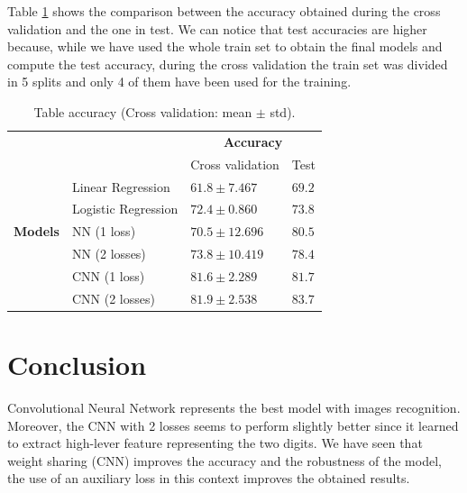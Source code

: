 \documentclass[journal, a4paper]{IEEEtran}
\begin{document}
Table \ref{table:accuracy} shows the comparison between the accuracy obtained during the cross validation and the one in test. We can notice that test accuracies are higher because, while we have used the whole train set to obtain the final models and compute the test accuracy, during the cross validation the train set was divided in 5 splits and only 4 of them have been used for the training.
\begin{table}
\centering
\caption{Table accuracy (Cross validation: mean $\pm$ std).}
\label{table:accuracy}
\begin{tabular}{|l|l|l|l|} 
\cline{3-4}
\multicolumn{1}{l}{} &                     & \multicolumn{2}{c|}{\textbf{Accuracy}}  \\ 
\cline{3-4}
\multicolumn{1}{l}{} &                     & Cross validation & Test                 \\ 
\hline
                     & Linear Regression   & $61.8\pm7.467$    & $69.2$                 \\ 
\cline{2-4}
     & Logistic Regression & $72.4 \pm0.860$    & $73.8$                 \\ 
\cline{2-4}
\textbf{Models}    & NN (1 loss)~        & $70.5 \pm12.696$   & $80.5$                 \\ 
\cline{2-4}
                     & NN (2 losses)~      & $73.8 \pm10.419$   & $78.4$                 \\ 
\cline{2-4}
                     & CNN (1 loss)~       & $81.6 \pm2.289$    & $81.7$                 \\ 
\cline{2-4}
                     & CNN (2 losses)      & $81.9 \pm2.538$    & $83.7$                 \\
\hline
\end{tabular}
\end{table}

\section{Conclusion}
\label{sec:conclusion}
Convolutional Neural Network represents the best model with images recognition. Moreover, the CNN with 2 losses seems to perform slightly better since it learned to extract high-lever feature representing the two digits. We have seen that weight sharing (CNN) improves the accuracy and the robustness of the model, the use of an auxiliary loss in this context improves the obtained results.

\end{document}
